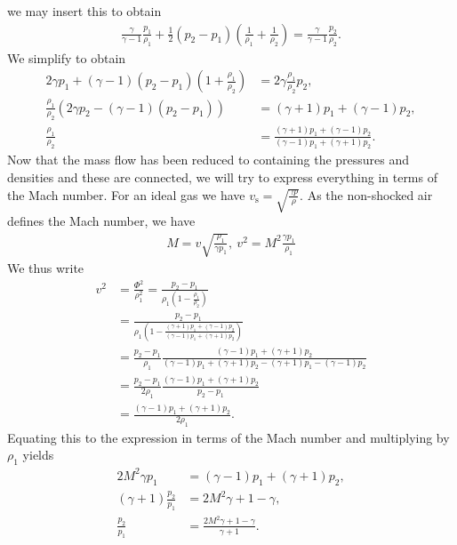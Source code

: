 we may insert this to obtain
\begin{align*}
	\frac{\gamma}{\gamma - 1}\frac{p_{1}}{\rho_{1}} + \frac{1}{2}(p_{2} - p_{1})\left(\frac{1}{\rho_{1}} + \frac{1}{\rho_{2}}\right) = \frac{\gamma}{\gamma - 1}\frac{p_{2}}{\rho_{2}}.
\end{align*}
We simplify to obtain
\begin{align*}
	2\gamma p_{1} + (\gamma - 1)(p_{2} - p_{1})\left(1 + \frac{\rho_{1}}{\rho_{2}}\right) &= 2\gamma\frac{\rho_{1}}{\rho_{2}}p_{2}, \\
	\frac{\rho_{1}}{\rho_{2}}\left(2\gamma p_{2} - (\gamma - 1)(p_{2} - p_{1})\right)     &= (\gamma + 1)p_{1} + (\gamma - 1)p_{2}, \\
	\frac{\rho_{1}}{\rho_{2}}                                                             &= \frac{(\gamma + 1)p_{1} + (\gamma - 1)p_{2}}{(\gamma - 1)p_{1} + (\gamma + 1)p_{2}}.
\end{align*}
Now that the mass flow has been reduced to containing the pressures and densities and these are connected, we will try to express everything in terms of the Mach number. For an ideal gas we have $v_{\text{s}} = \sqrt{\frac{\gamma p}{\rho}}$. As the non-shocked air defines the Mach number, we have
\begin{align*}
	M = v\sqrt{\frac{\rho_{1}}{\gamma p_{1}}},\ v^{2} = M^{2}\frac{\gamma p_{1}}{\rho_{1}}
\end{align*}
We thus write
\begin{align*}
	v^{2} &= \frac{\Phi^{2}}{\rho_{1}^{2}} = \frac{p_{2} - p_{1}}{\rho_{1}\left(1 - \frac{\rho_{1}}{\rho_{2}}\right)} \\
	      &= \frac{p_{2} - p_{1}}{\rho_{1}\left(1 - \frac{(\gamma + 1)p_{1} + (\gamma - 1)p_{2}}{(\gamma - 1)p_{1} + (\gamma + 1)p_{2}}\right)} \\
	      &= \frac{p_{2} - p_{1}}{\rho_{1}}\frac{(\gamma - 1)p_{1} + (\gamma + 1)p_{2}}{(\gamma - 1)p_{1} + (\gamma + 1)p_{2} - (\gamma + 1)p_{1} - (\gamma - 1)p_{2}} \\
	      &= \frac{p_{2} - p_{1}}{2\rho_{1}}\frac{(\gamma - 1)p_{1} + (\gamma + 1)p_{2}}{p_{2} - p_{1}} \\
	      &= \frac{(\gamma - 1)p_{1} + (\gamma + 1)p_{2}}{2\rho_{1}}.
\end{align*}
Equating this to the expression in terms of the Mach number and multiplying by $\rho_{1}$ yields
\begin{align*}
	2M^{2}\gamma p_{1}              &= (\gamma - 1)p_{1} + (\gamma + 1)p_{2}, \\
	(\gamma + 1)\frac{p_{2}}{p_{1}} &= 2M^{2}\gamma + 1 - \gamma, \\
	\frac{p_{2}}{p_{1}}             &= \frac{2M^{2}\gamma + 1 - \gamma}{\gamma + 1}.
\end{align*}
